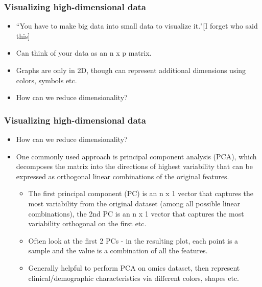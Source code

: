 \documentclass{beamer}
\begin{document}
\begin{frame}
\frametitle{Visualizing high-dimensional data}

\begin{itemize}
\item {\color{orange}``You have to make big data into small data to visualize it."}[I forget who said this]
\item Can think of your data as an n x p matrix. 
\item Graphs are only in 2D, though can represent additional dimensions using colors, symbols etc.
\item {\color{orange} How can we reduce dimensionality?}
\end{itemize}

\end{frame}


\begin{frame}
\frametitle{Visualizing high-dimensional data}

\begin{itemize}
\item {\color{orange} How can we reduce dimensionality?}
\item One commonly used approach is principal component analysis (PCA), which decomposes the matrix into the directions of 
highest variability that can be expressed as orthogonal linear combinations of the original features.
\begin{itemize}
\item The first principal component (PC) is an n x 1 vector that captures the most variability from the original dataset (among all possible linear combinations), the 2nd PC is an n x 1 vector that captures the most variability orthogonal on the first etc.
\item Often look at the first 2 PCs - in the resulting plot, each point is a sample and the value is a combination of all the features.
\item {\color{orange}Generally helpful to perform PCA on omics dataset, then represent clinical/demographic characteristics via different colors, shapes etc.}
\end{itemize}
\end{itemize}

\end{frame}

\end{document}
